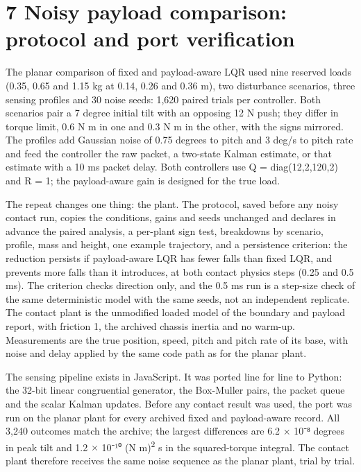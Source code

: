 \documentclass[11pt,a4paper]{article}
\begin{document}
\section*{7 Noisy payload comparison: protocol and port verification}
The planar comparison of fixed and payload-aware LQR used nine reserved loads (0.35, 0.65 and 1.15 kg at 0.14, 0.26 and 0.36 m), two disturbance scenarios, three sensing profiles and 30 noise seeds: 1,620 paired trials per controller. Both scenarios pair a 7 degree initial tilt with an opposing 12 N push; they differ in torque limit, 0.6 N m in one and 0.3 N m in the other, with the signs mirrored. The profiles add Gaussian noise of 0.75 degrees to pitch and 3 deg/s to pitch rate and feed the controller the raw packet, a two-state Kalman estimate, or that estimate with a 10 ms packet delay. Both controllers use Q = diag(12,2,120,2) and R = 1; the payload-aware gain is designed for the true load.

The repeat changes one thing: the plant. The protocol, saved before any noisy contact run, copies the conditions, gains and seeds unchanged and declares in advance the paired analysis, a per-plant sign test, breakdowns by scenario, profile, mass and height, one example trajectory, and a persistence criterion: the reduction persists if payload-aware LQR has fewer falls than fixed LQR, and prevents more falls than it introduces, at both contact physics steps (0.25 and 0.5 ms). The criterion checks direction only, and the 0.5 ms run is a step-size check of the same deterministic model with the same seeds, not an independent replicate. The contact plant is the unmodified loaded model of the boundary and payload report, with friction 1, the archived chassis inertia and no warm-up. Measurements are the true position, speed, pitch and pitch rate of its base, with noise and delay applied by the same code path as for the planar plant.

The sensing pipeline exists in JavaScript. It was ported line for line to Python: the 32-bit linear congruential generator, the Box-Muller pairs, the packet queue and the scalar Kalman updates. Before any contact result was used, the port was run on the planar plant for every archived fixed and payload-aware record. All 3,240 outcomes match the archive; the largest differences are 6.2 \ensuremath{\times} 10⁻⁸ degrees in peak tilt and 1.2 \ensuremath{\times} 10⁻¹⁰ (N m)\textsuperscript{2} s in the squared-torque integral. The contact plant therefore receives the same noise sequence as the planar plant, trial by trial.
\end{document}
